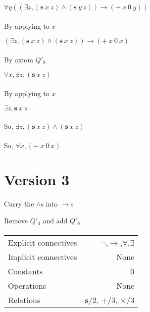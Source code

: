 \documentclass{article}
\begin{document}
$\forall y ((\exists z, (\mathbf{s}\ x\ z) \land (\mathbf{s}\ y\ z)) \rightarrow (+\ x\ 0\ y))$

\paragraph{}
By applying to $x$

$(\exists z, (\mathbf{s}\ x\ z) \land (\mathbf{s}\ x\ z)) \rightarrow (+\ x\ 0\ x)$

\paragraph{}
By axiom $Q'_{8}$

$\forall x, \exists z, (\mathbf{s}\ x \ z)$

\paragraph{}
By applying to $x$

$\exists z, \mathbf{s}\ x\ z$

\paragraph{}
So, $\exists z, (\mathbf{s}\ x \ z) \land (\mathbf{s}\ x\ z)$
 
\paragraph{}
So, $\forall x, (+\ x\ 0\ x)$ 


\section{Version 3}
\paragraph{}
Curry the $\land$s into $\rightarrow$s

Remove $Q'_{4}$ and add $Q'_{8}$

\paragraph{}

\begin{tabular}{l | r}
 \hline
 Explicit connectives & $\neg$,$\rightarrow $,$\forall$,$\exists$ \\
 Implicit connectives & None \\
 Constants & 0 \\
 Operations & None \\
 Relations & $\mathbf{s}$/2, $+$/3, $\times$/3\\
 \hline
\end{tabular}
\end{document}

